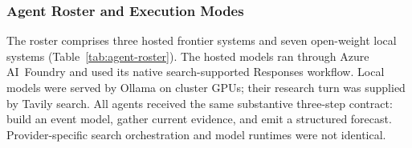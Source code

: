 \begin{center}
\begin{minipage}{\linewidth}
\centering
{}
\label{tab:markets}
\footnotesize
{}
\end{minipage}
\end{center}

\subsubsection{Agent Roster and Execution Modes}
\label{app:agent-roster}

The roster comprises three hosted frontier systems and seven open-weight local systems
(Table~\ref{tab:agent-roster}).  The hosted models ran through Azure AI~Foundry and used
its native search-supported Responses workflow.  Local models were served by Ollama on
cluster GPUs; their research turn was supplied by Tavily search.  All agents received the same substantive three-step contract: build an event
model, gather current evidence, and emit a structured forecast. Provider-specific
search orchestration and model runtimes were not identical.

